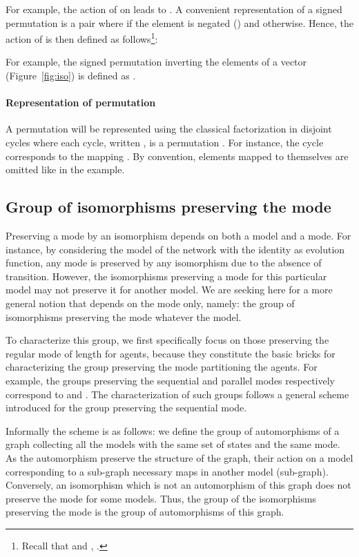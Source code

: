 \documentclass[12pt]{elsarticle}
\begin{document}
For example, the action of  on  leads to . 
A convenient representation of a signed permutation is a pair  where 
 if the  element is negated () and  otherwise. Hence, the action of  is then defined as follows\footnote{Recall that  and , .}: 

 For example, the signed permutation inverting the elements of a vector  (Figure~\ref{fig:iso}) is defined as . 

\paragraph{Representation of permutation} A permutation will be represented using the classical factorization in disjoint cycles where each cycle, written , is a permutation . For instance, the cycle  corresponds to the mapping . By convention, elements mapped to themselves are omitted like  in the example. 

\subsection{Group of isomorphisms preserving the mode}

Preserving a mode by an isomorphism depends on both a model and a mode. For instance, by considering the model of the network with the identity as evolution function, any mode is preserved by any isomorphism due to the absence of transition. However, the isomorphisms preserving a mode for this particular model may not preserve it for another model. We are seeking here for a more general notion that depends on the mode only, namely: the group of isomorphisms preserving the mode whatever the model. 

To characterize this group,  we first specifically focus on those preserving the regular mode of length  for  agents,   because they constitute the basic bricks for characterizing the group preserving the mode partitioning the agents. For example, the groups preserving the sequential and parallel modes respectively correspond to  and . The characterization of such groups follows a general scheme introduced for the group preserving the sequential mode. 

Informally the scheme is as follows: we define the group of automorphisms of a graph collecting all the models with the same set of states and the same mode. As the automorphism preserve the structure of the graph, their action on  a model corresponding to a sub-graph necessary maps in another model (sub-graph). Conversely, an isomorphism which is not an automorphism of this graph does not preserve the mode for some models. Thus, the group of the isomorphisms preserving the mode is the group of automorphisms of this graph.
\end{document}
